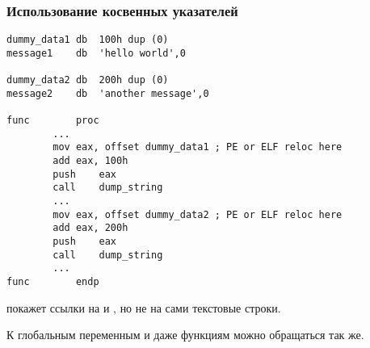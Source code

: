 \subsubsection{Использование косвенных указателей}

\begin{lstlisting}[style=customasmx86]
dummy_data1	db	100h dup (0)
message1	db	'hello world',0

dummy_data2	db	200h dup (0)
message2	db	'another message',0

func		proc
		...
		mov	eax, offset dummy_data1 ; PE or ELF reloc here
		add	eax, 100h
		push	eax
		call	dump_string
		...
		mov	eax, offset dummy_data2 ; PE or ELF reloc here
		add	eax, 200h
		push	eax
		call	dump_string
		...
func		endp
\end{lstlisting}

\IDA{} покажет ссылки на  и , но не на сами текстовые строки.

К глобальным переменным и даже функциям можно обращаться так же.


